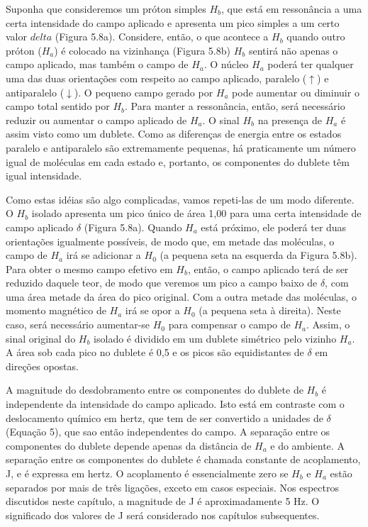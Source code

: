 Suponha que consideremos um próton simples $H_b$, que está em ressonância a uma certa intensidade do campo aplicado e apresenta um pico simples a um certo valor $delta$ (Figura 5.8a). Considere, então, o que acontece a $H_b$ quando outro próton ($H_a$) é colocado na vizinhança (Figura 5.8b) $H_b$ sentirá não apenas o campo aplicado, mas também o campo de $H_a$. O núcleo $H_a$ poderá ter qualquer uma das duas orientações com respeito ao campo aplicado, paralelo ($\uparrow$) e antiparalelo ($\downarrow$). O pequeno campo gerado por $H_a$ pode aumentar ou diminuir o campo total sentido por $H_b$. Para manter a ressonância, então, será necessário reduzir ou aumentar o campo aplicado de $H_a$. O sinal $H_b$ na presença de $H_a$ é assim visto como um dublete. Como as diferenças de energia entre os estados paralelo e antiparalelo são extremamente pequenas, há praticamente um número igual de moléculas em cada estado e, portanto, os componentes do dublete têm igual intensidade.

Como estas idéias são algo complicadas, vamos repeti-las de um modo diferente. O $H_b$ isolado apresenta um pico único de área 1,00 para uma certa intensidade de campo aplicado $\delta$ (Figura 5.8a). Quando $H_a$ está próximo, ele poderá ter duas orientações igualmente possíveis, de modo que, em metade das moléculas, o campo de $H_a$ irá se adicionar a $H_0$ (a pequena seta na esquerda da Figura 5.8b). Para obter o mesmo campo efetivo em $H_b$, então, o campo aplicado terá de ser reduzido daquele teor, de modo que veremos um pico a campo baixo de $\delta$, com uma área metade da área do pico original. Com a outra metade das moléculas, o momento magnético de $H_a$ irá se opor a $H_0$ (a pequena seta à direita). Neste caso, será necessário aumentar-se $H_0$ para compensar o campo de $H_a$. Assim, o sinal original do $H_b$ isolado é dividido em um dublete simétrico pelo vizinho $H_a$. A área sob cada pico no dublete é 0,5 e os picos são equidistantes de $\delta$ em direções opostas.

A magnitude do desdobramento entre os componentes do dublete de $H_b$ é independente da intensidade do campo aplicado. Isto está em contraste com o deslocamento químico em hertz, que tem de ser convertido a unidades de $\delta$ (Equação 5), que sao então independentes do campo. A separação entre os componentes do dublete depende apenas da distância de $H_a$ e do ambiente. A separação entre os componentes do dublete é chamada constante de acoplamento, J, e é expressa em hertz. O acoplamento é essencialmente zero se $H_b$ e $H_a$ estão separados por mais de três ligações, exceto em casos especiais. Nos espectros discutidos neste capítulo, a magnitude de J é aproximadamente 5 Hz. O significado dos valores de J será considerado nos capítulos subsequentes. 

